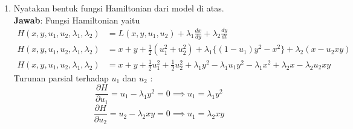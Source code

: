 \documentclass{article}
\begin{document}
\begin{enumerate}[label=\alph*.]
    \item Nyatakan bentuk fungsi Hamiltonian dari model di atas.\\
    \textbf{Jawab}: Fungsi Hamiltonian yaitu
    \begin{align*}
        H(x,y,u_1,u_2,\lambda_1,\lambda_2) &= L(x,y,u_1,u_2)+\lambda_1\frac{dx}{dy} + \lambda_2\frac{dy}{dt} \\
        H(x,y,u_1,u_2,\lambda_1,\lambda_2) &= x+y+\frac{1}{2}(u_1^2+u_2^2) +\lambda_1\{(1-u_1)y^2-x^2\}+\lambda_2(x-u_2xy) \\
        H(x,y,u_1,u_2,\lambda_1,\lambda_2) &= x+y+\frac{1}{2}u_1^2+\frac{1}{2}u_2^2+\lambda_1y^2-\lambda_1u_1y^2-\lambda_1 x^2 + \lambda_2x - \lambda_2u_2xy
    \end{align*}
    Turunan parsial terhadap \(u_1\) dan \(u_2\) :
    \[
    \frac{\partial H}{\partial u_1}=u_1-\lambda_1y^2=0 \implies u_1 = \lambda_1 y^2
    \]
    \[
    \frac{\partial H}{\partial u_2}=u_2-\lambda_2xy=0 \implies u_1 = \lambda_2 xy
    \]
    

\end{enumerate}
\end{document}
